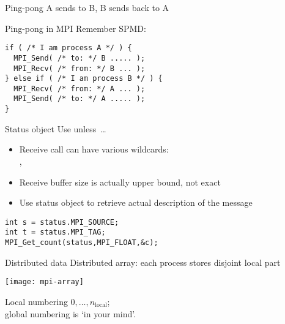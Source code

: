 \begin{numberedframe}{Ping-pong}
  A sends to B, B sends back to A

\end{numberedframe}

\begin{numberedframe}{Ping-pong in MPI}
Remember SPMD:
\lstset{language=C}
\begin{lstlisting}
if ( /* I am process A */ ) {
  MPI_Send( /* to: */ B ..... );
  MPI_Recv( /* from: */ B ... );
} else if ( /* I am process B */ ) {
  MPI_Recv( /* from: */ A ... );
  MPI_Send( /* to: */ A ..... );
}
\end{lstlisting}
\end{numberedframe}


\begin{numberedframe}{Status object}
 Use  unless~\ldots

  \begin{itemize}
  \item Receive call can have various wildcards:\\
    , 
  \item Receive buffer size is actually upper bound, not exact
  \item Use status object to retrieve actual description of the message
  \end{itemize}
\begin{lstlisting}
int s = status.MPI_SOURCE;
int t = status.MPI_TAG;
MPI_Get_count(status,MPI_FLOAT,&c);
\end{lstlisting}
\end{numberedframe}

\begin{exerciseframe}[pingpong]
  
\end{exerciseframe}



\begin{numberedframe}{Distributed data}
  Distributed array: each process stores disjoint local part
  
  \texttt{[image: mpi-array]}

  Local numbering $0,\ldots,n_{\mathrm{local}}$;\\
  global numbering is `in your mind'.
\end{numberedframe}

